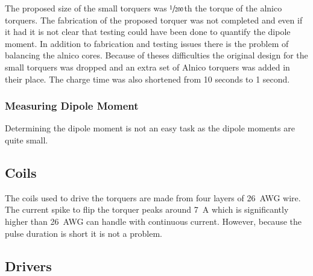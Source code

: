 The proposed size of the small torquers was $\sfrac{1}{200}$th the torque of the alnico torquers. The fabrication of the proposed torquer was not completed and even if it had it is not clear that testing could have been done to quantify the dipole moment. In addition to fabrication and testing issues there is the problem of balancing the alnico cores. Because of theses difficulties the original design for the small torquers was dropped and an extra set of Alnico torquers was added in their place. The charge time was also shortened from 10 seconds to 1 second.

\subsubsection{Measuring Dipole Moment}

Determining the dipole moment is not an easy task as the dipole moments are quite small. 

\subsection{Coils}

The coils used to drive the torquers are made from four layers of 26~AWG wire. The current spike to flip the torquer peaks around 7~A which is significantly higher than 26~AWG can handle with continuous current. However, because the pulse duration is short it is not a problem.

\subsection{Drivers}

